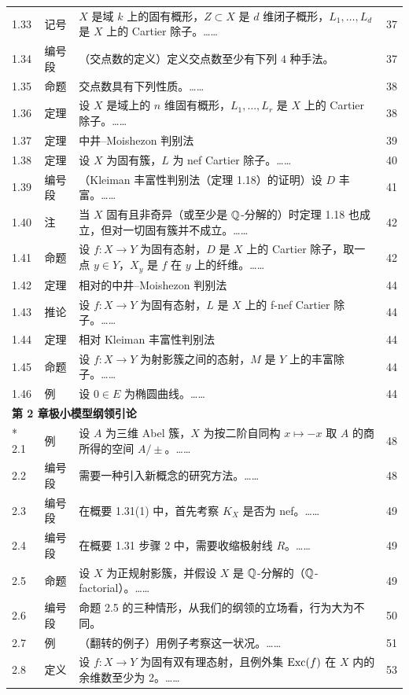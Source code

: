 \begin{longtable}{@{}p{}p{}p{}p{}@{}}
1.33 & 记号 & $X$ 是域 $k$ 上的固有概形，$Z\subset X$ 是 $d$ 维闭子概形，$L_1,\dots,L_d$ 是 $X$ 上的 Cartier 除子。…… & 37 \\
1.34 & 编号段 & （交点数的定义）\quad 定义交点数至少有下列 $4$ 种手法。 & 37 \\
1.35 & 命题 & 交点数具有下列性质。…… & 38 \\
1.36 & 定理 & 设 $X$ 是域上的 $n$ 维固有概形，$L_1,\dots,L_r$ 是 $X$ 上的 Cartier 除子。…… & 38 \\
1.37 & 定理 & 中井--Moishezon 判别法 & 39 \\
1.38 & 定理 & 设 $X$ 为固有簇，$L$ 为 nef Cartier 除子。…… & 40 \\
1.39 & 编号段 & （Kleiman 丰富性判别法（定理 1.18）的证明）\quad 设 $D$ 丰富。…… & 41 \\
1.40 & 注 & 当 $X$ 固有且非奇异（或至少是 $\mathbb{Q}$-分解的）时定理 1.18 也成立，但对一切固有簇并不成立。…… & 42 \\
1.41 & 命题 & 设 $f:X\to Y$ 为固有态射，$D$ 是 $X$ 上的 Cartier 除子，取一点 $y\in Y$，$X_y$ 是 $f$ 在 $y$ 上的纤维。…… & 42 \\
1.42 & 定理 & 相对的中井--Moishezon 判别法 & 44 \\
1.43 & 推论 & 设 $f:X\to Y$ 为固有态射，$L$ 是 $X$ 上的 f-nef Cartier 除子。…… & 44 \\
1.44 & 定理 & 相对 Kleiman 丰富性判别法 & 44 \\
1.45 & 命题 & 设 $f:X\to Y$ 为射影簇之间的态射，$M$ 是 $Y$ 上的丰富除子。…… & 44 \\
1.46 & 例 & 设 $0\in E$ 为椭圆曲线。…… & 44 \\
\multicolumn{4}{l}{\textbf{第 2 章\quad 极小模型纲领引论}}\\*
2.1 & 例 & 设 $A$ 为三维 Abel 簇，$X$ 为按二阶自同构 $x\mapsto -x$ 取 $A$ 的商所得的空间 $A/\pm$。…… & 48 \\
2.2 & 编号段 & 需要一种引入新概念的研究方法。…… & 48 \\
2.3 & 编号段 & 在概要 1.31(1) 中，首先考察 $K_X$ 是否为 nef。…… & 49 \\
2.4 & 编号段 & 在概要 1.31 步骤 2 中，需要收缩极射线 $R$。…… & 49 \\
2.5 & 命题 & 设 $X$ 为正规射影簇，并假设 $X$ 是 $\mathbb{Q}$-分解的（$\mathbb{Q}$-factorial）。…… & 49 \\
2.6 & 编号段 & 命题 2.5 的三种情形，从我们的纲领的立场看，行为大为不同。 & 50 \\
2.7 & 例 & （翻转的例子）用例子考察这一状况。…… & 51 \\
2.8 & 定义 & 设 $f\colon X\to Y$ 为固有双有理态射，且例外集 $\operatorname{Exc}(f)$ 在 $X$ 内的余维数至少为 2。…… & 53 \\

\end{longtable}
